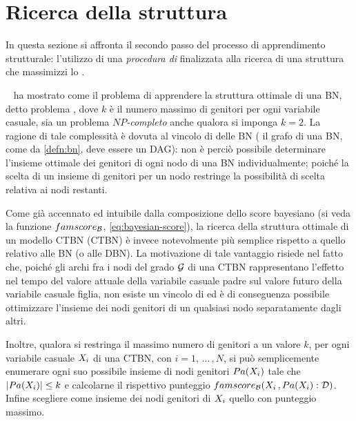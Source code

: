 \section{Ricerca della struttura}\label{sec:structurallearning-search}
In questa sezione si affronta il secondo passo del processo di apprendimento strutturale: l'utilizzo di una \emph{procedura di } finalizzata alla ricerca di una struttura che massimizzi lo \emph{}.

~\citet{Chickering1994} ha mostrato come il problema di apprendere la struttura ottimale di una \acl{BN}, detto problema \emph{}, dove $k$ è il numero massimo di genitori per ogni variabile casuale, sia un problema \emph{$NP$-completo} anche qualora si imponga $k=2$. La ragione di tale complessità è dovuta al vincolo di  delle \acs{BN} (\ie{} il grafo di una \acs{BN}, come da \autoref{defn:bn}, deve essere un \acs{DAG}): non è perciò possibile determinare l'insieme ottimale dei genitori di ogni nodo di una \acs{BN} individualmente; poiché la scelta di un insieme di genitori per un nodo restringe la possibilità di scelta relativa ai nodi restanti.

Come già accennato ed intuibile dalla composizione dello score bayesiano (si veda la funzione $famscore_{\mathcal{B}}$, \autoref{eq:bayesian-score}), la ricerca della struttura ottimale di un modello \acl{CTBN} (\acs{CTBN}) è invece notevolmente più semplice rispetto a quello relativo alle \acs{BN} (o alle \acs{DBN}). La motivazione di tale vantaggio risiede nel fatto che, poiché gli archi fra i nodi del grado $\mathcal{G}$ di una \acs{CTBN} rappresentano l'effetto nel tempo del valore attuale della variabile casuale padre sul valore futuro della variabile casuale figlia, non esiste un vincolo di  ed è di conseguenza possibile ottimizzare l'insieme dei nodi genitori di un qualsiasi nodo separatamente dagli altri.

Inoltre, qualora si restringa il massimo numero di genitori a un valore $k$, per ogni variabile casuale $\mathnormal{X}_i$ di una \acs{CTBN}, con $i=1,\,\dotsc\,,N$, si può semplicemente enumerare ogni suo possibile insieme di nodi genitori $Pa(\mathnormal{X}_i)$ tale che $\arrowvert Pa(\mathnormal{X}_i) \arrowvert \leq k$ e calcolarne il rispettivo punteggio $famscore_{\mathcal{B}}(\mathnormal{X}_i\,,Pa(\mathnormal{X}_i):\mathcal{D})$. Infine scegliere come insieme dei nodi genitori di $\mathnormal{X}_i$ quello con punteggio massimo.

